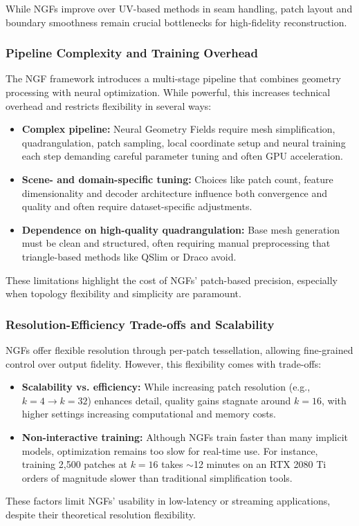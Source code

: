 While NGFs improve over UV-based methods in seam handling, patch layout and boundary smoothness remain crucial bottlenecks for high-fidelity reconstruction. 

\subsubsection{Pipeline Complexity and Training Overhead}

The NGF framework introduces a multi-stage pipeline that combines geometry processing with neural optimization. 
While powerful, this increases technical overhead and restricts flexibility in several ways: 

\begin{itemize}
    \item \textbf{Complex pipeline:} Neural Geometry Fields require mesh simplification, quadrangulation, patch sampling, local coordinate setup and neural training each step demanding careful parameter tuning and often GPU acceleration.
    \item \textbf{Scene- and domain-specific tuning:} Choices like patch count, feature dimensionality and decoder architecture influence both convergence and quality and often require dataset-specific adjustments.
    \item \textbf{Dependence on high-quality quadrangulation:} Base mesh generation must be clean and structured, often requiring manual preprocessing that triangle-based methods like QSlim or Draco avoid.
\end{itemize}

These limitations highlight the cost of NGFs' patch-based precision, especially when topology flexibility and simplicity are paramount. 

\subsubsection{Resolution-Efficiency Trade-offs and Scalability}

NGFs offer flexible resolution through per-patch tessellation, allowing fine-grained control over output fidelity. 
However, this flexibility comes with trade-offs: 

\begin{itemize}
    \item \textbf{Scalability vs. efficiency:} While increasing patch resolution (e.g., $k = 4 \rightarrow k = 32$) enhances detail, quality gains stagnate around $k = 16$, with higher settings increasing computational and memory costs.
    \item \textbf{Non-interactive training:} Although NGFs train faster than many implicit models, optimization remains too slow for real-time use. For instance, training 2,500 patches at $k = 16$ takes $\sim$12 minutes on an RTX 2080 Ti orders of magnitude slower than traditional simplification tools.
\end{itemize}

These factors limit NGFs' usability in low-latency or streaming applications, despite their theoretical resolution flexibility. 
